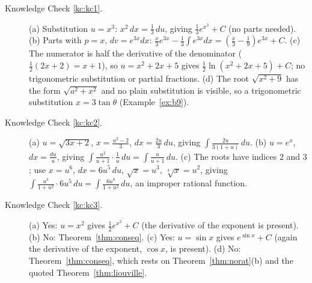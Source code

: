 \documentclass[11pt]{article}
\begin{document}
\begin{description}
  \item[Knowledge Check \ref{kc:kc1}.] (a) Substitution $u=x^3$: $x^2\,dx=\frac13\,du$, giving $\frac13e^{x^3}+C$ (no parts needed). (b) Parts with $p=x$, $dv=e^{3x}dx$: $\frac x3e^{3x}-\frac13\int e^{3x}dx=\left(\frac x3-\frac19\right)e^{3x}+C$. (c) The numerator is half the derivative of the denominator ($\frac12(2x+2)=x+1$), so $u=x^2+2x+5$ gives $\frac12\ln\left(x^2+2x+5\right)+C$; no trigonometric substitution or partial fractions. (d) The root $\sqrt{x^2+9}$ has the form $\sqrt{a^2+x^2}$ and no plain substitution is visible, so a trigonometric substitution $x=3\tan\theta$ (Example~\ref{ex:b9}).

  \item[Knowledge Check \ref{kc:kc2}.] (a) $u=\sqrt{3x+2}$, $x=\frac{u^2-2}3$, $dx=\frac{2u}3\,du$, giving $\int\frac{2u}{3(1+u)}\,du$. (b) $u=e^x$, $dx=\frac{du}u$, giving $\int\frac{u^2}{u+1}\cdot\frac1u\,du=\int\frac u{u+1}\,du$. (c) The roots have indices $2$ and $3$; use $x=u^6$, $dx=6u^5\,du$, $\sqrt x=u^3$, $\sqrt[3]x=u^2$, giving $\int\frac{u^3}{1+u^2}\cdot6u^5\,du=\int\frac{6u^8}{1+u^2}\,du$, an improper rational function.

  \item[Knowledge Check \ref{kc:kc3}.] (a) Yes: $u=x^2$ gives $\frac12e^{x^2}+C$ (the derivative of the exponent is present). (b) No: Theorem~\ref{thm:conseq}. (c) Yes: $u=\sin x$ gives $e^{\sin x}+C$ (again the derivative of the exponent, $\cos x$, is present). (d) No: Theorem~\ref{thm:conseq}, which rests on Theorem~\ref{thm:norat}(b) and the quoted Theorem~\ref{thm:liouville}.


\end{description}
\end{document}
